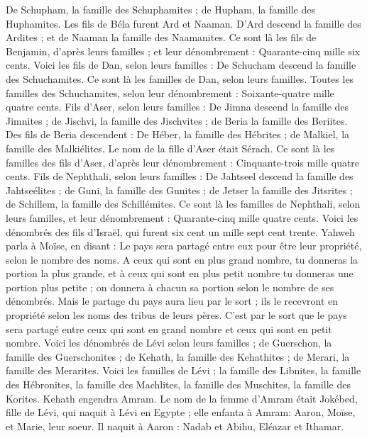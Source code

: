 \begin{multicols}{2}
De Schupham, la famille des Schuphamites ; de Hupham, la famille des Huphamites.
Les fils de Béla furent Ard et Naaman. D'Ard descend la famille des Ardites ; et de Naaman la famille des Naamanites.
Ce sont là les fils de Benjamin, d’après leurs familles ; et leur dénombrement : Quarante-cinq mille six cents.
Voici les fils de Dan, selon leurs familles : De Schucham descend la famille des Schuchamites. Ce sont là les familles de Dan, selon leurs familles.
Toutes les familles des Schuchamites, selon leur dénombrement : Soixante-quatre mille quatre cents.
Fils d'Aser, selon leurs familles : De Jimna descend la famille des Jimnites ; de Jischvi, la famille des Jischvites ; de Beria la famille des Beriites.
Des fils de Beria descendent : De Héber, la famille des Hébrites ; de Malkiel, la famille des Malkiélites.
Le nom de la fille d'Aser était Sérach.
Ce sont là les familles des fils d'Aser, d’après leur dénombrement : Cinquante-trois mille quatre cents.
Fils de Nephthali, selon leurs familles : De Jahtseel descend la famille des Jahtseélites ; de Guni, la famille des Gunites ;
de Jetser la famille des Jitsrites ; de Schillem, la famille des Schillémites.
Ce sont là les familles de Nephthali, selon leurs familles, et leur dénombrement : Quarante-cinq mille quatre cents.
Voici les dénombrés des fils d'Israël, qui furent six cent un mille sept cent trente.
Yahweh parla à Moïse, en disant :
Le pays sera partagé entre eux pour être leur propriété, selon le nombre des noms.
A ceux qui sont en plus grand nombre, tu donneras la portion la plus grande, et à ceux qui sont en plus petit nombre tu donneras une portion plus petite ; on donnera à chacun sa portion selon le nombre de ses dénombrés.
Mais le partage du pays aura lieu par le sort ; ils le recevront en propriété selon les noms des tribus de leurs pères.
C’est par le sort que le pays sera partagé entre ceux qui sont en grand nombre et ceux qui sont en petit nombre.
Voici les dénombrés de Lévi selon leurs familles ; de Guerschon, la famille des Guerschonites ; de Kehath, la famille des Kehathites ; de Merari, la famille des Merarites.
Voici les familles de Lévi ; la famille des Libnites, la famille des Hébronites, la famille des Machlites, la famille des Muschites, la famille des Korites. Kehath engendra Amram.
Le nom de la femme d’Amram était Jokébed, fille de Lévi, qui naquit à Lévi en Egypte ; elle enfanta à Amram: Aaron, Moïse, et Marie, leur soeur.
Il naquit à Aaron : Nadab et Abihu, Eléazar et Ithamar.

\end{multicols}
